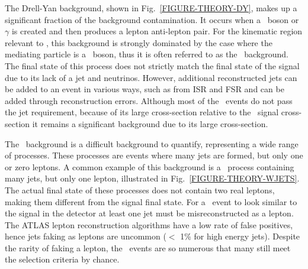 

The Drell-Yan background, shown in Fig.~\ref{FIGURE-THEORY-DY}, makes up a significant fraction of the background contamination. It occurs when a \Zboson\ boson or $\gamma$ is created and then produces a lepton anti-lepton pair. For the kinematic region relevant to \Wtchan, this background is strongly dominated by the case where the mediating particle is a \Zboson\ boson, thus it is often referred to as the \Zjets\ background. The final state of this process does not strictly match the final state of the signal due to its lack of a jet and neutrinos. However, additional reconstructed jets can be added to an event in various ways, such as from ISR and FSR and \MET can be added through reconstruction errors.  Although most of the \Zjets\ events do not pass the jet requirement, because of its large cross-section relative to the \Wtchan\ signal cross-section it remains a significant background due to its large cross-section.


The \multijet\ background is a difficult background to quantify, representing a wide range of processes. These processes are events where many jets are formed, but only one or zero leptons. A common example of this background is a \Wjets\ process containing many jets, but only one lepton, illustrated in Fig.~\ref{FIGURE-THEORY-WJETS}. The actual final state of these processes does not contain two real leptons, making them different from the signal final state. For a \multijet\ event to look similar to the signal in the detector at least one jet must be misreconstructed as a lepton. The ATLAS lepton reconstruction algorithms have a low rate of false positives, hence jets faking as leptons are uncommon ($<$ 1\% for high energy jets). Despite the rarity of faking a lepton, the \multijet\ events are so numerous that many still meet the selection criteria by chance. 

